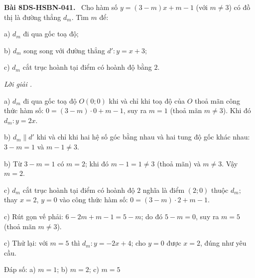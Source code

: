 \documentclass[12pt,a4paper]{article}
\newenvironment{problem}[1][]{\par\medskip\noindent\textbf{Bài #1.}\ }{\par}
\newenvironment{solution}[1][]{\par\noindent\textit{Lời giải #1.}\par}{\par}
\begin{document}
\begin{problem}[8DS-HSBN-041]
Cho hàm số $y = (3 - m)x + m - 1$ (với $m \neq 3$) có đồ thị là đường thẳng $d_m$. Tìm $m$ để:

a) $d_m$ đi qua gốc toạ độ;

b) $d_m$ song song với đường thẳng $d'\colon y = x + 3$;

c) $d_m$ cắt trục hoành tại điểm có hoành độ bằng $2$.

\begin{solution}
a) $d_m$ đi qua gốc toạ độ $O(0; 0)$ khi và chỉ khi toạ độ của $O$ thoả mãn công thức hàm số: $0 = (3 - m) \cdot 0 + m - 1$, suy ra $m = 1$ (thoả mãn $m \neq 3$). Khi đó $d_m\colon y = 2x$.

b) $d_m \parallel d'$ khi và chỉ khi hai hệ số góc bằng nhau và hai tung độ gốc khác nhau: $3 - m = 1$ và $m - 1 \neq 3$.

b) Từ $3 - m = 1$ có $m = 2$; khi đó $m - 1 = 1 \neq 3$ (thoả mãn) và $m \neq 3$. Vậy $m = 2$.

c) $d_m$ cắt trục hoành tại điểm có hoành độ $2$ nghĩa là điểm $(2; 0)$ thuộc $d_m$; thay $x = 2$, $y = 0$ vào công thức hàm số: $0 = (3 - m) \cdot 2 + m - 1$.

c) Rút gọn vế phải: $6 - 2m + m - 1 = 5 - m$; do đó $5 - m = 0$, suy ra $m = 5$ (thoả mãn $m \neq 3$).

c) Thử lại: với $m = 5$ thì $d_m\colon y = -2x + 4$; cho $y = 0$ được $x = 2$, đúng như yêu cầu.

Đáp số: a) $\boxed{m = 1}$; b) $\boxed{m = 2}$; c) $\boxed{m = 5}$
\end{solution}
\end{problem}
\end{document}
